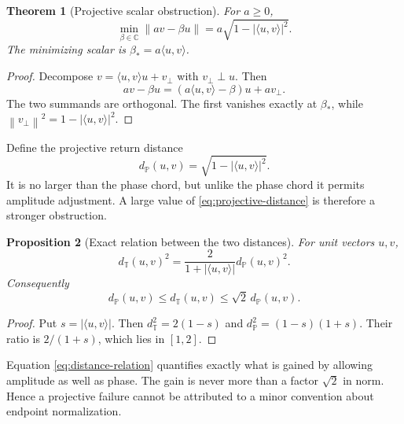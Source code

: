 \documentclass[12pt]{article}
\newtheorem{theorem}{Theorem}[section]
\newtheorem{proposition}[theorem]{Proposition}
\theoremstyle{remark}
\newcommand{\norm}[1]{\left\lVert#1\right\rVert}
\begin{document}
\begin{theorem}[Projective scalar obstruction]\label{thm:scalar}
For $a\ge0$,
\begin{equation}\label{eq:scalar-min}
 \min_{\beta\in\mathbb C}\norm{av-\beta u}
 =a\sqrt{1-|\langle u,v\rangle|^2}.
\end{equation}
The minimizing scalar is
$\beta_*=a\langle u,v\rangle$.
\end{theorem}

\begin{proof}
Decompose
$v=\langle u,v\rangle u+v_\perp$ with $v_\perp\perp u$.  Then
\[
 av-\beta u
 =(a\langle u,v\rangle-\beta)u+av_\perp.
\]
The two summands are orthogonal.  The first vanishes exactly at
$\beta_*$, while
$\norm{v_\perp}^2=1-|\langle u,v\rangle|^2$.
\end{proof}

Define the projective return distance
\begin{equation}\label{eq:projective-distance}
 d_{\mathbb P}(u,v)=
 \sqrt{1-|\langle u,v\rangle|^2}.
\end{equation}
It is no larger than the phase chord, but unlike the phase chord it permits
amplitude adjustment.  A large value of \eqref{eq:projective-distance} is
therefore a stronger obstruction.

\begin{proposition}[Exact relation between the two distances]
For unit vectors $u,v$,
\begin{equation}\label{eq:distance-relation}
 d_{\mathbb T}(u,v)^2
 =\frac{2}{1+|\langle u,v\rangle|}
 d_{\mathbb P}(u,v)^2.
\end{equation}
Consequently
\begin{equation}\label{eq:distance-comparison}
 d_{\mathbb P}(u,v)\le d_{\mathbb T}(u,v)
 \le\sqrt2\,d_{\mathbb P}(u,v).
\end{equation}
\end{proposition}

\begin{proof}
Put $s=|\langle u,v\rangle|$.  Then
$d_{\mathbb T}^2=2(1-s)$ and
$d_{\mathbb P}^2=(1-s)(1+s)$.  Their ratio is $2/(1+s)$,
which lies in $[1,2]$.
\end{proof}

Equation \eqref{eq:distance-relation} quantifies exactly what is gained by
allowing amplitude as well as phase.  The gain is never more than a factor
$\sqrt2$ in norm.  Hence a projective failure cannot be attributed to a
minor convention about endpoint normalization.
\end{document}
